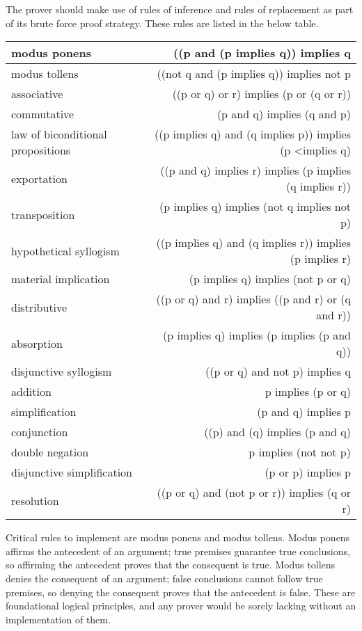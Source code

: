 \documentclass{l4proj}
\begin{document}
The prover should make use of rules of inference and rules of replacement as part of its brute force proof strategy. These rules are listed in the below table\cite{infrules}. 

\begin{tabular}{| l | r |} 
\hline modus ponens & ((p and (p implies q)) implies q \\
\hline modus tollens & ((not q and (p implies q)) implies not p \\
\hline associative & ((p or q) or r) implies (p or (q or r)) \\
\hline commutative & (p and q) implies (q and p) \\
\hline law of biconditional propositions & ((p implies q) and (q implies p)) implies (p <implies q) \\
\hline exportation & ((p and q) implies r) implies (p implies (q implies r)) \\
\hline transposition & (p implies q) implies (not q implies not p) \\
\hline hypothetical syllogism & ((p implies q) and (q implies r)) implies (p implies r) \\
\hline material implication & (p implies q) implies (not p or q) \\
\hline distributive & ((p or q) and r) implies ((p and r) or (q and r)) \\
\hline absorption & (p implies q) implies (p implies (p and q)) \\
\hline disjunctive syllogism & ((p or q) and not p) implies q \\
\hline addition & p implies (p or q) \\
\hline simplification & (p and q) implies p \\
\hline conjunction & ((p) and (q) implies (p and q) \\
\hline double negation & p implies (not not p) \\
\hline disjunctive simplification & (p or p) implies p \\
\hline resolution & ((p or q) and (not p or r)) implies (q or r) \\
\hline
\end{tabular}

Critical rules to implement are modus ponens and modus tollens. Modus ponens affirms the antecedent of an argument; true premises guarantee true conclusions, so affirming the antecedent proves that the consequent is true. Modus tollens denies the consequent of an argument; false conclusions cannot follow true premises, so denying the consequent proves that the antecedent is false. These are foundational logical principles, and any prover would be sorely lacking without an implementation of them. 
\end{document}
